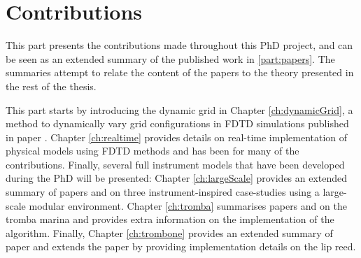 \chapter*{Contributions}
This part presents the contributions made throughout this PhD project, and can be seen as an extended summary of the published work in \ref{part:papers}. The summaries attempt to relate the content of the papers to the theory presented in the rest of the thesis. 

This part starts by introducing the dynamic grid in Chapter \ref{ch:dynamicGrid}, a method to dynamically vary grid configurations in FDTD simulations published in paper \citeP[G]. Chapter \ref{ch:realtime} provides details on real-time implementation of physical models using FDTD methods and has been for many of the contributions. 
Finally, several full instrument models that have been developed during the PhD will be presented: Chapter \ref{ch:largeScale} provides an extended summary of papers \citeP[A] and \citeP[B] on three instrument-inspired case-studies using a large-scale modular environment. Chapter \ref{ch:tromba} summarises papers \citeP[D] and \citeP[E] on the tromba marina and provides extra information on the implementation of the algorithm. Finally, Chapter \ref{ch:trombone} provides an extended summary of paper \citeP[H] and extends the paper by providing implementation details on the lip reed.